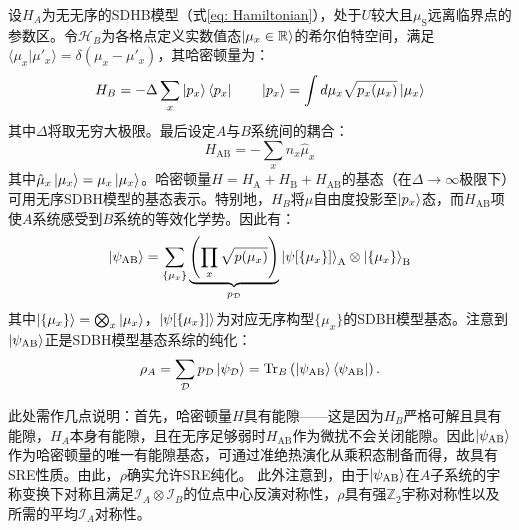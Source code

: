 \documentclass[preprint,superscriptaddress,floatfix, nofootinbib]{revtex4-2}
\begin{document}
\begin{CJK*}{UTF8}{gbsn}
设$H_A$为无无序的SDHB模型（式\eqref{eq: Hamiltonian}），处于$U$较大且$\mu_{\text{S}}$远离临界点的参数区。令$\mathcal{H}_B$为各格点定义实数值态$\ket{\mu_x \in \mathbb{R}}$的希尔伯特空间，满足$\langle \mu_x|\mu'_x\rangle =  \delta(\mu_x - \mu'_x)$，其哈密顿量为：
\begin{equation}
    H_{B} = -\Delta \sum_{x} \ket{p_x} \bra{p_x} \qquad \ket{p_x} = \int d\mu_x \sqrt{p_x(\mu_x)} \ket{\mu_x}
\end{equation}
其中$\Delta$将取无穷大极限。最后设定$A$与$B$系统间的耦合：
\begin{equation}
    H_{\text{AB}} = - \sum_{x} n_x \hat{\mu}_x
\end{equation}
其中$\hat{\mu}_x \ket{\mu_x} = \mu_x \ket{\mu_x}$。哈密顿量$H = H_{\text{A}} + H_{\text{B}} + H_{\text{AB}}$的基态（在$\Delta \to \infty$极限下）可用无序SDBH模型的基态表示。特别地，$H_B$将$\mu$自由度投影至$\ket{p_x}$态，而$H_{\text{AB}}$项使$A$系统感受到$B$系统的等效化学势。因此有：
\begin{equation}
    \ket{\psi_{\text{AB}}} = \sum_{\{\mu_x\}} \underbrace{\left(\prod_{x} \sqrt{p(\mu_x)} \right)}_{p_{\mathcal{D}}} \ket{\psi[\{\mu_x\}]}_{\text{A}} \otimes \ket{\{\mu_x\}}_{\text{B}}
\end{equation}
其中$\ket{\{\mu_x\}} = \bigotimes_x\ket{\mu_x}$，$\ket{\psi[\{\mu_x\}]}$为对应无序构型$\{\mu_x\}$的SDBH模型基态。注意到$\ket{\psi_{\text{AB}}}$正是SDBH模型基态系综的纯化：
\begin{equation}
    \rho_A = \sum_{\mathcal{D}} p_{\mathcal{D}} \ket{\psi_{\mathcal{D}}} = \text{Tr}_B\left(\ket{\psi_{\text{AB}}}\bra{\psi_{\text{AB}}}\right).
\end{equation}

此处需作几点说明：首先，哈密顿量$H$具有能隙——这是因为$H_B$严格可解且具有能隙，$H_A$本身有能隙，且在无序足够弱时$H_{\text{AB}}$作为微扰不会关闭能隙。因此$\ket{\psi_{\text{AB}}}$作为哈密顿量的唯一有能隙基态，可通过准绝热演化从乘积态制备而得，故具有SRE性质。由此，$\rho$确实允许SRE纯化。
此外注意到，由于$\ket{\psi_{\text{AB}}}$在$A$子系统的宇称变换下对称且满足$\mathcal{I}_A \otimes \mathcal{I}_B$的位点中心反演对称性，$\rho$具有强$\mathbb{Z}_2$宇称对称性以及所需的平均$\mathcal{I}_A$对称性。


\end{CJK*}
\end{document}
